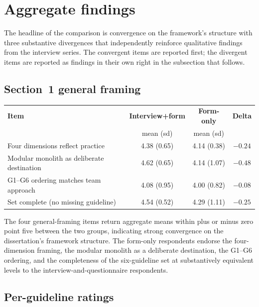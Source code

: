 \section*{Aggregate findings}

The headline of the comparison is convergence on the framework's structure with three substantive divergences that independently reinforce qualitative findings from the interview series. The convergent items are reported first; the divergent items are reported as findings in their own right in the subsection that follows.

\subsection*{Section~1 general framing}

\begin{longtable}{p{6cm} c c c}
\toprule
\textbf{Item} & \textbf{Interview+form} & \textbf{Form-only} & \textbf{Delta} \\
& mean (sd) & mean (sd) & \\
\midrule
\endhead
Four dimensions reflect practice & 4.38 (0.65) & 4.14 (0.38) & $-0.24$ \\
Modular monolith as deliberate destination & 4.62 (0.65) & 4.14 (1.07) & $-0.48$ \\
G1--G6 ordering matches team approach & 4.08 (0.95) & 4.00 (0.82) & $-0.08$ \\
Set complete (no missing guideline) & 4.54 (0.52) & 4.29 (1.11) & $-0.25$ \\
\bottomrule
\end{longtable}

\noindent
The four general-framing items return aggregate means within plus or minus zero point five between the two groups, indicating strong convergence on the dissertation's framework structure. The form-only respondents endorse the four-dimension framing, the modular monolith as a deliberate destination, the G1--G6 ordering, and the completeness of the six-guideline set at substantively equivalent levels to the interview-and-questionnaire respondents.

\subsection*{Per-guideline ratings}

